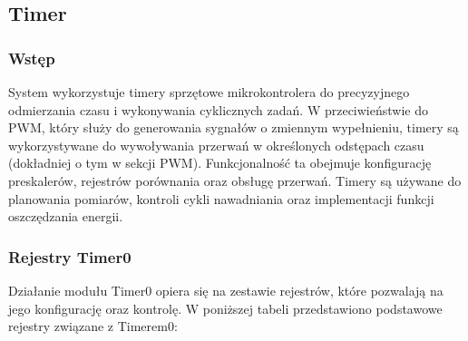 \subsection{Timer}

\subsubsection{Wstęp}
System wykorzystuje timery sprzętowe mikrokontrolera do precyzyjnego odmierzania czasu i wykonywania cyklicznych zadań. W przeciwieństwie do PWM, który służy do generowania sygnałów o zmiennym wypełnieniu, timery są wykorzystywane do wywoływania przerwań w określonych odstępach czasu (dokładniej o tym w sekcji PWM). Funkcjonalność ta obejmuje konfigurację preskalerów, rejestrów porównania oraz obsługę przerwań. Timery są używane do planowania pomiarów, kontroli cykli nawadniania oraz implementacji funkcji oszczędzania energii.

\subsubsection{Rejestry Timer0}

Działanie modułu Timer0 opiera się na zestawie rejestrów, które pozwalają na jego konfigurację oraz kontrolę. W poniższej tabeli przedstawiono podstawowe rejestry związane z Timerem0:

